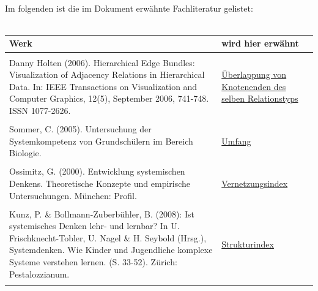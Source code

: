 \documentclass[enabledeprecatedfontcommands,fontsize=11pt,paper=a4,twoside]{scrartcl}
\begin{document}
	\\ \\ \\
	Im folgenden ist die im Dokument erwähnte Fachliteratur gelistet: \\ \\
	\begin{tabular}{p{11cm}p{5cm}}
		Werk & wird hier erwähnt \\ \hline \\
		Danny Holten (2006). Hierarchical Edge Bundles: Visualization of Adjacency Relations in Hierarchical Data. In: IEEE Transactions on Visualization and Computer Graphics, 12(5), September 2006, 741-748. ISSN 1077-2626. & \hyperlink{cc}{Überlappung von Knotenenden des selben Relationstyps} \\ \\ 
		Sommer, C. (2005). Untersuchung der Systemkompetenz von Grundschülern im Bereich Biologie.& \hyperlink{Umfang}{Umfang} \\ \\
		Ossimitz, G. (2000). Entwicklung systemischen Denkens. Theoretische Konzepte und empirische Untersuchungen. München: Profil. & \hyperlink{Vernetzungsindex}{Vernetzungsindex} \\ \\
		Kunz, P. \& Bollmann-Zuberbühler, B. (2008): Ist systemisches Denken lehr- und lernbar? In U. Frischknecht-Tobler, U. Nagel \& H. Seybold (Hrsg.), Systemdenken. Wie Kinder und Jugendliche komplexe Systeme verstehen lernen. (S. 33-52). Zürich: Pestalozzianum. & \hyperlink{Strukturindex}{Strukturindex} \\ \\
	\end{tabular}
	
	
	
	
	\newpage
\end{document}
